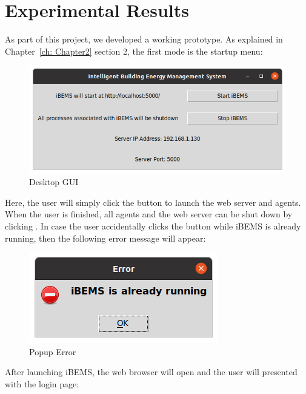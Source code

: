 \chapter{Experimental Results}
\label{ch: Chapter4}

As part of this project, we developed a working prototype. As explained in Chapter~\ref{ch: Chapter2} section 2, the first mode is the startup menu:

\begin{figure}[H]
    \centering
    \includegraphics[scale=0.5]{figs/GUI/BEMS_GUI_Linux.png}
    \caption{Desktop GUI}
    \label{fig:desktopgui}
\end{figure}

\noindent
Here, the user will simply click the  button to launch the web
server and agents. When the user is finished, all agents and the web server can
be shut down by clicking . In case the user accidentally clicks the
 button while iBEMS is already running, then the following error
message will appear:

\begin{figure}[H]
    \centering
    \includegraphics[scale=0.5]{figs/GUI/BEMS_GUI_Linux_Warning.png}
    \caption{Popup Error}
    \label{fig:popuperror}
\end{figure}

\noindent
After launching iBEMS, the web browser will open and the user will presented with the login page:

